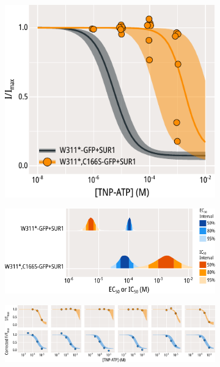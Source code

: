 \begin{figure}[h]
\begin{subfigure}[t]{0.3\textwidth}
		\includegraphics[width=\textwidth]{c166s_7.pdf}
	\end{subfigure}
	\hfill
	\begin{subfigure}[t]{0.6\textwidth}
		\caption{}\label{ch5fig:c166s_params_2}
		\centering
		\includegraphics[width=\textwidth]{c166s_8.pdf}
	\end{subfigure}
	\vfill
	\begin{subfigure}[t]{0.9\textwidth}
		\caption{}\label{ch5fig:c166s_indfits_2}
		\centering
		\includegraphics[width=\textwidth]{c166s_9.pdf}
	\end{subfigure}

\end{figure}
